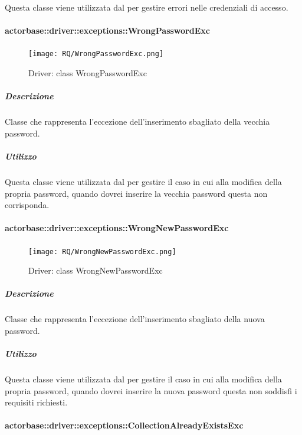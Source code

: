 \documentclass{scalatekids-article}
\begin{document}
Questa classe viene utilizzata dal  per gestire errori nelle credenziali di accesso.


\paragraph{actorbase::driver::exceptions::WrongPasswordExc}

\begin{figure}[H]
  \begin{center}
    \texttt{[image: RQ/WrongPasswordExc.png]}
    \caption{Driver: class WrongPasswordExc}
  \end{center}
\end{figure}

\subparagraph{Descrizione}

Classe che rappresenta l'eccezione dell'inserimento sbagliato della vecchia password.

\subparagraph{Utilizzo}

Questa classe viene utilizzata dal  per gestire il caso in cui alla modifica della propria password, quando dovrei inserire la vecchia password questa non corrisponda.

\paragraph{actorbase::driver::exceptions::WrongNewPasswordExc}

\begin{figure}[H]
  \begin{center}
    \texttt{[image: RQ/WrongNewPasswordExc.png]}
    \caption{Driver: class WrongNewPasswordExc}
  \end{center}
\end{figure}

\subparagraph{Descrizione}

Classe che rappresenta l'eccezione dell'inserimento sbagliato della nuova password.

\subparagraph{Utilizzo}

Questa classe viene utilizzata dal  per gestire il caso in cui alla modifica della propria password, quando dovrei inserire la nuova password questa non soddisfi i requisiti richiesti.

\paragraph{actorbase::driver::exceptions::CollectionAlreadyExistsExc}
\end{document}
